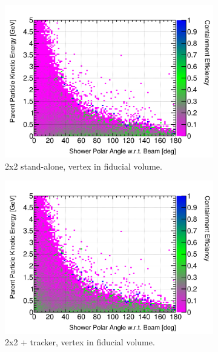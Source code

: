 \documentclass[10pt,a4paper,openany]{article}
\begin{document}
\begin{figure}[!htb]
\begin{subfigure}[b]{0.49\textwidth}
		\label{}
	\end{subfigure}	
	\begin{subfigure}[b]{0.49\textwidth}
		\centering
    \includegraphics[width=1.0\textwidth]{Pi0_cont_eff_2x2_fiducial.png}
		\caption{2x2 stand-alone, vertex in fiducial volume.}
		\label{}
	\end{subfigure}	
	\hfill
	\begin{subfigure}[b]{0.49\textwidth}
		\centering
		\includegraphics[width=1.0\textwidth]{Pi0_cont_eff_2x2_Scintillator_fiducial_gap.png}
		\caption{2x2 + tracker, vertex in fiducial volume.}
		\label{}
	\end{subfigure}
	\begin{subfigure}[b]{0.49\textwidth}
		\centering

\end{subfigure}
\end{figure}
\end{document}
